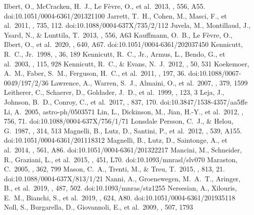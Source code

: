 \documentclass{aa}
\begin{document}
\begin{thebibliography}{}
  Ilbert, O., McCracken, H.~J., Le F{\`e}vre, O., et al.\ 2013, \aap, 556, A55. doi:10.1051/0004-6361/201321100
  Jarrett, T.~H., Cohen, M., Masci, F., et al.\ 2011, \apj, 735, 112. doi:10.1088/0004-637X/735/2/112
  Juvela, M., Montillaud, J., Ysard, N., \& Lunttila, T.\ 2013, \aap, 556, A63
  Kauffmann, O.~B., Le F{\`e}vre, O., Ilbert, O., et al.\ 2020, \aap, 640, A67. doi:10.1051/0004-6361/202037450
  Kennicutt, R.~C., Jr.\ 1998, \araa, 36, 189
  Kennicutt, R.~C., Jr., Armus, L., Bendo, G., et al.\ 2003, \pasp, 115, 928
  Kennicutt, R.~C., \& Evans, N.~J.\ 2012, \araa, 50, 531
  Koekemoer, A.~M., Faber, S.~M., Ferguson, H.~C., et al.\ 2011, \apjs, 197, 36. doi:10.1088/0067-0049/197/2/36
  Lawrence, A., Warren, S.~J., Almaini, O., et al.\ 2007, \mnras, 379, 1599
  Leitherer, C., Schaerer, D., Goldader, J.~D., et al.\ 1999, \apjs, 123, 3
  Leja, J., Johnson, B.~D., Conroy, C., et al.\ 2017, \apj, 837, 170. doi:10.3847/1538-4357/aa5ffe
 Li, A.\ 2005, astro-ph/0503571
  Lin, L., Dickinson, M., Jian, H.-Y., et al.\ 2012, \apj, 756, 71. doi:10.1088/0004-637X/756/1/71
  Lonsdale Persson, C.~J., \& Helou, G.\ 1987, \apj, 314, 513
  Magnelli, B., Lutz, D., Santini, P., et al.\ 2012, \aap, 539, A155. doi:10.1051/0004-6361/201118312
  Magnelli, B., Lutz, D., Saintonge, A., et al.\ 2014, \aap, 561, A86. doi:10.1051/0004-6361/201322217
  Mancini, M., Schneider, R., Graziani, L., et al.\ 2015, \mnras, 451, L70. doi:10.1093/mnrasl/slv070
  Maraston, C.\ 2005, \mnras, 362, 799 
  Mason, C.~A., Trenti, M., \& Treu, T.\ 2015, \apj, 813, 21. doi:10.1088/0004-637X/813/1/21
  Nanni, A., Groenewegen, M.~A.~T., Aringer, B., et al.\ 2019, \mnras, 487, 502. doi:10.1093/mnras/stz1255
  Nersesian, A., Xilouris, E.~M., Bianchi, S., et al.\ 2019, \aap, 624, A80. doi:10.1051/0004-6361/201935118
  Noll, S., Burgarella, D., Giovannoli, E., et al.\ 2009, \aap, 507, 1793

\end{thebibliography}
\end{document}
